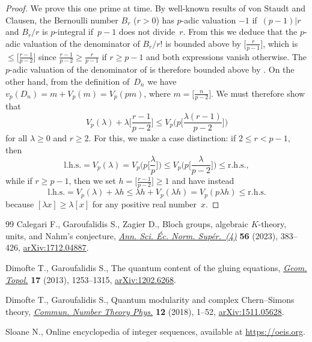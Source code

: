 \documentclass[11pt]{article}
\numberwithin{equation}{section}
\numberwithin{equation}{section}
\def\l{\lambda}
\def\l{\lambda}
\def\l{\lambda}
\begin{document}
\begin{proof}
We prove this one prime at time. By well-known results of
von Staudt and Clausen, the Bernoulli number $B_r$ ($r>0$) has $p$-adic valuation
$-1$ if~${(p-1)|r}$ and $B_r/r$ is $p$-integral if~${p-1}$ does not divide~$r$. From this
we deduce that the $p$-adic valuation of the denominator of $B_r/r!$ is bounded
above by $\bigl[\frac r{p-1}\bigr]$, which is $\le\bigl[\frac {r-1}{p-2}\bigr]$
since $\frac{r-1}{p-2}\ge\frac r{p-1}$ if $r\ge p-1$ and both expressions
vanish otherwise. The $p$-adic valuation of the denominator of
\smash{$\frac1{\l!}\bigl(\frac{B_r}{r!}\bigr)^\l$} is therefore bounded above by
\smash{$V_p(\l)+\l\bigl[\frac{r-1}{p-2}\bigr]$}. On the other hand, from the definition
of~$D_n$ we have $v_p(D_n)=m+V_p(m)=V_p(pm)$, where $m=\bigl[\frac n{p-2}\bigr] $.
We must therefore show that
\[
V_p(\l)+\l \biggl[\frac{r-1}{p-2}\biggr] \le
V_p\biggl(p \biggr[\frac{\l(r-1)}{p-2}\biggr]\biggl)
\]
for all $\l\ge0$ and $r\ge2$. For this, we make a case distinction: if $ 2\le r<p-1$, then
\[
\text{l.h.s.} = V_p(\l) = V_p\biggl(p \biggl[\frac\l p\biggr]\biggr) \le
V_p\biggl(p \biggl[\frac\l{p-2}\biggr]\biggr) \le \text{r.h.s.} ,
\]
while if $r\ge p-1$, then we set $h=\bigl[\frac{r-1}{p-2}\bigr]\ge1$ and have
instead
\[
\text{l.h.s.} = V_p(\l)+\l h \le \l h+V_p(\l h) = V_p(p\l h) \le \text{r.h.s.}
\]
because $[\l x]\ge \l [x]$ for any positive real number~$x$.
\end{proof}
\begin{thebibliography}{99}
Calegari F., Garoufalidis S., Zagier D., Bloch groups, algebraic {$K$}-theory,
 units, and {N}ahm's conjecture, \href{https://doi.org/10.24033/asens.2537}{\textit{Ann. Sci. \'Ec. Norm. Sup\'er.~(4)}}
 \textbf{56} (2023), 383--426, \href{https://arxiv.org/abs/1712.04887}{arXiv:1712.04887}.

Dimofte T., Garoufalidis S., The quantum content of the gluing equations,
  \href{https://doi.org/10.2140/gt.2013.17.1253}{\textit{Geom. Topol.}} \textbf{17} (2013), 1253--1315, \href{https://arxiv.org/abs/1202.6268}{arXiv:1202.6268}.

Dimofte T., Garoufalidis S., Quantum modularity and complex {C}hern--{S}imons
 theory, \href{https://doi.org/10.4310/CNTP.2018.v12.n1.a1}{\textit{Commun. Number Theory Phys.}} \textbf{12} (2018), 1--52,
 \href{https://arxiv.org/abs/1511.05628}{arXiv:1511.05628}.

Sloane N., Online encyclopedia of integer sequences, available at
 \url{https://oeis.org}.

\end{thebibliography}
\end{document}
